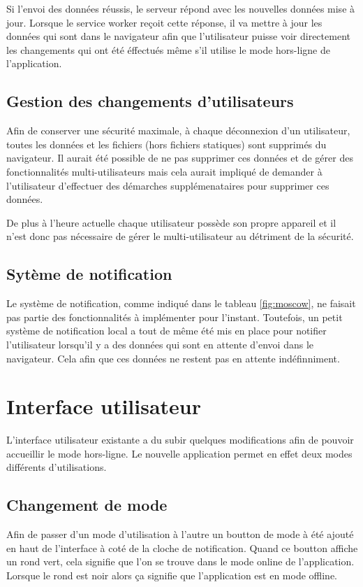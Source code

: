 \documentclass{EPL-master-thesis-covers-FR}
\begin{document}
					Si l'envoi des données réussis, le serveur répond avec les nouvelles données mise à jour. Lorsque le service worker reçoit cette réponse, il va mettre à jour les données qui sont dans le navigateur afin que l'utilisateur puisse voir directement les changements qui ont été éffectués même s'il utilise le mode hors-ligne de l'application.
			
			\subsection{Gestion des changements d'utilisateurs}		
				Afin de conserver une sécurité maximale, à chaque déconnexion d'un utilisateur, toutes les données et les fichiers (hors fichiers statiques) sont supprimés du navigateur. Il aurait été possible de ne pas supprimer ces données et de gérer des fonctionnalités multi-utilisateurs mais cela aurait impliqué de demander à l'utilisateur d'effectuer des démarches supplémenataires pour supprimer ces données. 
			
				De plus à l'heure actuelle chaque utilisateur possède son propre appareil et il n'est donc pas nécessaire de gérer le multi-utilisateur au détriment de la sécurité.
				
			\subsection{Sytème de notification}
				Le système de notification, comme indiqué dans le tableau \ref{fig:moscow}, ne faisait pas partie des fonctionnalités à implémenter pour l'instant. Toutefois, un petit système de notification local a tout de même été mis en place pour notifier l'utilisateur lorsqu'il y a des données qui sont en attente d'envoi dans le navigateur. Cela afin que ces données ne restent pas en attente indéfinniment.
		
		
		\section{Interface utilisateur}
			L'interface utilisateur existante a du subir quelques modifications afin de pouvoir accueillir le mode hors-ligne. Le nouvelle application permet en effet deux modes différents d'utilisations.
			
			\subsection{Changement de mode}
				Afin de passer d'un mode d'utilisation à l'autre un boutton de mode à été ajouté en haut de l'interface à coté de la cloche de notification. Quand ce boutton affiche un rond vert, cela signifie que l'on se trouve dans le mode online de l'application. Lorsque le rond est noir alors ça signifie que l'application est en mode offline.
				
\end{document}

